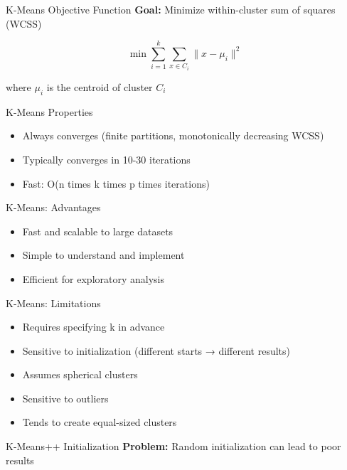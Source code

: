 \documentclass[aspectratio=169,ignorenonframetext]{beamer}
\begin{document}
\begin{frame}{K-Means Objective Function}
\textbf{Goal:} Minimize within-cluster sum of squares (WCSS)

\[\min\sum_{i = 1}^{k}\sum_{x \in C_{i}}\| x - \mu_{i}\|^{2}\]

where \(\mu_{i}\) is the centroid of cluster \(C_{i}\)
\end{frame}

\begin{frame}{K-Means Properties}
\begin{itemize}
\item
  Always converges (finite partitions, monotonically decreasing WCSS)
\item
  Typically converges in 10-30 iterations
\item
  Fast: O(n times k times p times iterations)
\end{itemize}
\end{frame}

\begin{frame}{K-Means: Advantages}
\begin{itemize}
\item
  Fast and scalable to large datasets
\item
  Simple to understand and implement
\item
  Efficient for exploratory analysis
\end{itemize}
\end{frame}

\begin{frame}{K-Means: Limitations}
\begin{itemize}
\item
  Requires specifying k in advance
\item
  Sensitive to initialization (different starts → different results)
\item
  Assumes spherical clusters
\item
  Sensitive to outliers
\item
  Tends to create equal-sized clusters
\end{itemize}
\end{frame}

\begin{frame}{K-Means++ Initialization}
\textbf{Problem:} Random initialization can lead to poor results
\end{frame}
\end{document}
